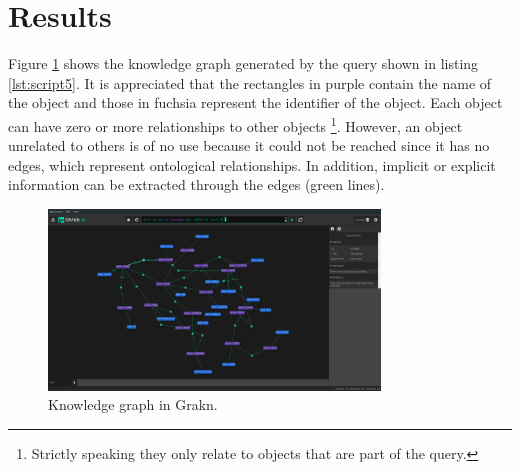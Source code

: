\section{Results}
\label{sec:results}
Figure \ref{fig:grafGra} shows the knowledge graph generated by the query shown 
in listing \ref{lst:script5}. It is appreciated that the rectangles in purple 
contain the name of the object and those in fuchsia represent the identifier of 
the object. Each object can have zero or more relationships to other objects
\footnote{Strictly speaking they only relate to objects that are part of the 
query.}. However, an object unrelated to others is of no use because it could 
not be reached since it has no edges, which represent ontological relationships. 
In addition, implicit or explicit information can be extracted through the 
edges (green lines).



\begin{figure}[H]
    \centering
    \includegraphics[width=8.8cm]{figures/allrel.png}
    \caption{Knowledge graph in Grakn.}
    \label{fig:grafGra}
\end{figure}

